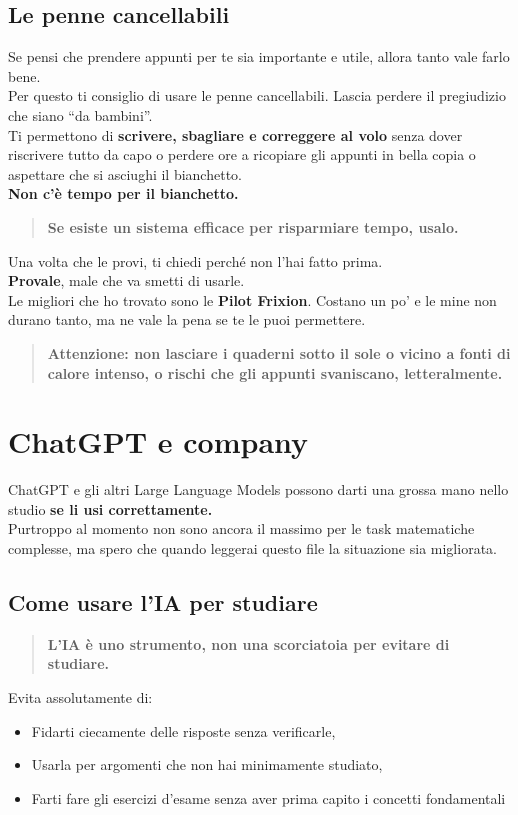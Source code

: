 \documentclass[18pt]{extarticle}
\begin{document}
\subsection{Le penne cancellabili}
Se pensi che prendere appunti per te sia importante e utile, allora tanto vale farlo bene.\\
Per questo ti consiglio di usare le penne cancellabili. Lascia perdere il pregiudizio che siano ``da bambini''.\\
Ti permettono di \textbf{scrivere, sbagliare e correggere al volo} senza dover riscrivere tutto da capo o perdere ore a ricopiare gli appunti in bella copia o aspettare che si asciughi il bianchetto.\\
\textbf{Non c'è tempo per il bianchetto.}
\begin{quote}
\textbf{Se esiste un sistema efficace per risparmiare tempo, usalo.}
\end{quote}
Una volta che le provi, ti chiedi perché non l'hai fatto prima.\\
\textbf{Provale}, male che va smetti di usarle.\\
Le migliori che ho trovato sono le \textbf{Pilot Frixion}. Costano un po' e le mine non durano tanto, ma ne vale la pena se te le puoi permettere.
\begin{quote}
\textbf{Attenzione: non lasciare i quaderni sotto il sole o vicino a fonti di calore intenso, o rischi che gli appunti svaniscano, letteralmente.}
\end{quote}


\section{ChatGPT e company}
ChatGPT e gli altri Large Language Models possono darti una grossa mano nello studio \textbf{se li usi correttamente.}\\
Purtroppo al momento non sono ancora il massimo per le task matematiche complesse, ma spero che quando leggerai questo file la situazione sia migliorata.


\subsection{Come usare l'IA per studiare}
\begin{quote}
\textbf{L'IA è uno strumento, non una scorciatoia per evitare di studiare.}
\end{quote}
Evita assolutamente di:
\begin{itemize}
\item Fidarti ciecamente delle risposte senza verificarle,
\item Usarla per argomenti che non hai minimamente studiato,
\item Farti fare gli esercizi d'esame senza aver prima capito i concetti fondamentali
\end{itemize}
\end{document}
